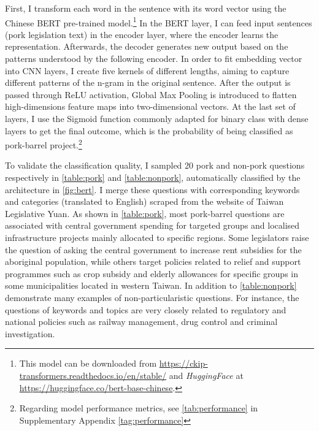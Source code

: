 First, I transform each word in the sentence with its word vector using the Chinese BERT pre-trained model.\footnote{This model can be downloaded from \href{ https://ckip-transformers.readthedocs.io/en/stable/}{ https://ckip-transformers.readthedocs.io/en/stable/} and \textit{HuggingFace} at \href{https://huggingface.co/bert-base-chinese}{https://huggingface.co/bert-base-chinese}.}  In the BERT layer, I can feed input sentences (pork legislation text) in the encoder layer, where the encoder learns the representation. Afterwards, the decoder generates new output based on the patterns understood by the following encoder. In order to fit embedding vector into CNN layers, I create five kernels of different lengths, aiming to capture different patterns of the n-gram in the original sentence. After the output is passed through ReLU activation, Global Max Pooling is introduced to flatten high-dimensions feature maps into two-dimensional vectors. At the last set of layers, I use the Sigmoid function commonly adapted for binary class with dense layers to get the final outcome, which is the probability of being classified as pork-barrel project.\footnote{Regarding model performance metrics, see \autoref{tab:performance} in Supplementary Appendix \ref{tag:performance} }



To validate the classification quality, I sampled 20 pork and non-pork questions respectively in \autoref{table:pork} and \autoref{table:nonpork}, automatically classified by the architecture in \autoref{fig:bert}. I merge these questions with corresponding keywords and categories (translated to English) scraped from the website of Taiwan Legislative Yuan. As shown in \autoref{table:pork}, most pork-barrel questions are associated with central government spending for targeted groups and localised infrastructure projects mainly allocated to specific regions. Some legislators raise the question of asking the central government to increase rent subsidies for the aboriginal population, while others target policies related to relief and support programmes such as crop subsidy and elderly allowances for specific groups in some municipalities located in western Taiwan. In addition to \autoref{table:nonpork} demonstrate many examples of non-particularistic questions. For instance, the questions of keywords and topics are very closely related to regulatory and national policies such as railway management, drug control and criminal investigation. 


